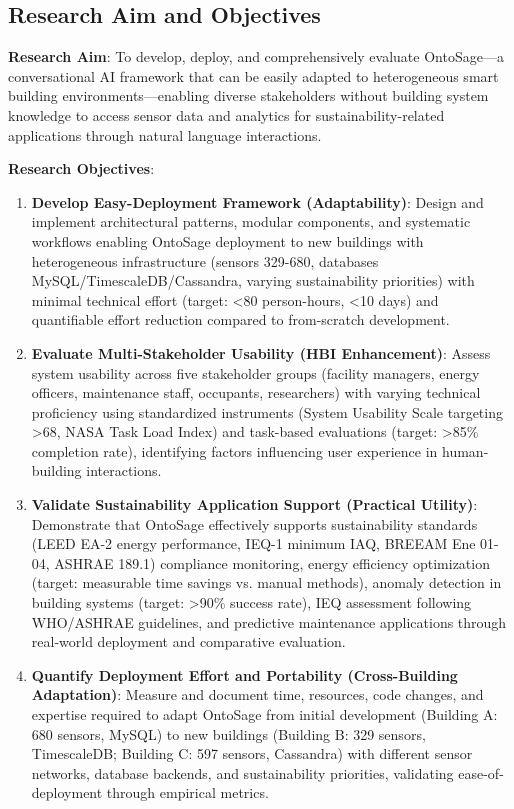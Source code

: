 \documentclass[acmlarge]{acmart}
\begin{document}
\subsection{Research Aim and Objectives}

\textbf{Research Aim}: To develop, deploy, and comprehensively evaluate OntoSage—a conversational AI framework that can be easily adapted to heterogeneous smart building environments—enabling diverse stakeholders without building system knowledge to access sensor data and analytics for sustainability-related applications through natural language interactions.

\textbf{Research Objectives}:

\begin{enumerate}
    \item \textbf{Develop Easy-Deployment Framework (Adaptability)}: Design and implement architectural patterns, modular components, and systematic workflows enabling OntoSage deployment to new buildings with heterogeneous infrastructure (sensors 329-680, databases MySQL/TimescaleDB/Cassandra, varying sustainability priorities) with minimal technical effort (target: <80 person-hours, <10 days) and quantifiable effort reduction compared to from-scratch development.
    
    \item \textbf{Evaluate Multi-Stakeholder Usability (HBI Enhancement)}: Assess system usability across five stakeholder groups (facility managers, energy officers, maintenance staff, occupants, researchers) with varying technical proficiency using standardized instruments (System Usability Scale targeting >68, NASA Task Load Index) and task-based evaluations (target: >85\% completion rate), identifying factors influencing user experience in human-building interactions.
    
    \item \textbf{Validate Sustainability Application Support (Practical Utility)}: Demonstrate that OntoSage effectively supports sustainability standards (LEED EA-2 energy performance, IEQ-1 minimum IAQ, BREEAM Ene 01-04, ASHRAE 189.1) compliance monitoring, energy efficiency optimization (target: measurable time savings vs. manual methods), anomaly detection in building systems (target: >90\% success rate), IEQ assessment following WHO/ASHRAE guidelines, and predictive maintenance applications through real-world deployment and comparative evaluation.
    
    \item \textbf{Quantify Deployment Effort and Portability (Cross-Building Adaptation)}: Measure and document time, resources, code changes, and expertise required to adapt OntoSage from initial development (Building A: 680 sensors, MySQL) to new buildings (Building B: 329 sensors, TimescaleDB; Building C: 597 sensors, Cassandra) with different sensor networks, database backends, and sustainability priorities, validating ease-of-deployment through empirical metrics.
    

\end{enumerate}
\end{document}

